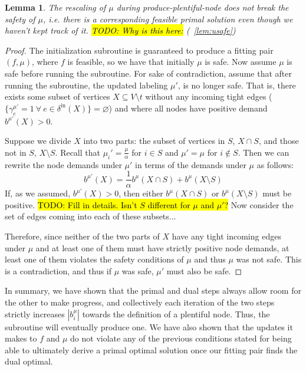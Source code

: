\documentclass[11pt]{article}
\newtheorem{lemma}[theorem]{Lemma}
\theoremstyle{definition}
\theoremstyle{definition}
\newcommand{\biu}{b_{i}^{\mu}}
\newcommand{\vnott}{V \setminus t}
\newcommand{\din}{\delta^{\text{in}}}
\newcommand{\fp}{(f,\mu)}
\newcommand{\todo}[1]{\hl{TODO: #1}}
\begin{document}
		\begin{lemma}
			The rescaling of $\mu$ during produce-plentiful-node does not break 
			the safety of $\mu$, i.e. there is a corresponding feasible primal
			solution even though we haven't kept track of it.
			\todo{Why is this here:} (~\ref{lem:usafe})
		\end{lemma}
		\begin{proof}
		The initialization subroutine is guaranteed to produce a fitting pair $\fp$,
		where $f$ is feasible, so we have that initially $\mu$ is safe. Now assume $\mu$
		is safe before running the subroutine. For sake of contradiction, assume that
		after running the subroutine, the updated labeling $\mu'$,
		is no longer safe. That is, there exists some subset of vertices $X \subseteq \vnott$  
		without any incoming tight edges ($\{\gamma_e^{\mu'} = 1\ \forall\ e \in \din(X)\} = \varnothing$)
		and where all nodes have positive demand $b^{\mu'}(X) > 0$.
		
		Suppose we divide $X$ into two parts: the subset of vertices in $S$, $X \cap S$, and those
		not in $S$, $X \setminus S$. Recall that $\mu_i' = \frac{\mu}{\alpha}$ for $i\in S$
		and $\mu' = \mu$ for $i \notin S$. Then we can rewrite the node demands under $\mu'$
		in terms of the demands under $\mu$ as follows:
		$$b^{\mu'}(X) = \frac{1}{\alpha}b^{\mu}(X \cap S) + b^{\mu}(X \setminus S)$$
		If, as we assumed, $b^{\mu'}(X) > 0$, then either $b^{\mu}(X \cap S)$ or 
		$b^{\mu}(X \setminus S)$ must be positive.
		\todo{Fill in details. Isn't $S$ different for $\mu$ and $\mu'$?}
		Now consider the set of edges coming into each of these subsets...
		
		Therefore, since neither of the two parts of $X$
		have any tight incoming edges under $\mu$ and at least one of them
		must have strictly positive node demands, at least one of them
		violates the safety conditions of $\mu$ and thus $\mu$ was not safe.
		This is a contradiction, and thus if $\mu$ was safe, $\mu'$ must also be safe.
		
		\end{proof}
		
		In summary, we have shown that the primal and dual steps always allow room for the other to make progress, and collectively each iteration of the two steps strictly increases $|\biu|$ towards
		the definition of a plentiful node. Thus, the subroutine will eventually produce one. We have also shown that the updates it makes to $f$ and $\mu$ do not violate any of the previous conditions stated for being able to ultimately derive a primal optimal solution once our fitting pair finds the dual optimal. 
		
\end{document}
